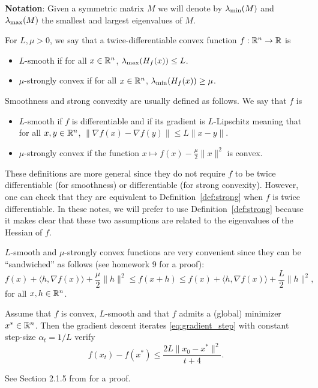 \documentclass[11pt,nocut]{article}
\begin{document}
\textbf{Notation}: Given a symmetric matrix $M$ we will denote by $\lambda_{\rm min}(M)$ and $\lambda_{\rm max}(M)$ the smallest and largest eigenvalues of $M$. 
\begin{definition}\label{def:strong}
	For $L,\mu >0$, we say that a twice-differentiable convex function $f: \mathbb{R}^n \to \mathbb{R}$ is
	\begin{itemize}
		\item $L$-smooth if for all $x \in \mathbb{R}^n$, $\lambda_{\rm max}(H_f(x)) \leq L$.
		\item $\mu$-strongly convex if for all $x \in \mathbb{R}^n$, $\lambda_{\rm min}(H_f(x)) \geq \mu$.
	\end{itemize}
\end{definition}
\begin{remark}
	Smoothness and strong convexity are usually defined as follows. We say that $f$ is
	\begin{itemize}
		\item $L$-smooth if $f$ is differentiable and if its gradient is $L$-Lipschitz meaning that for all $x,y \in \mathbb{R}^n$, $\| \nabla f(x) - \nabla f(y) \| \leq L \|x-y\|$.
		\item $\mu$-strongly convex if the function $x \mapsto f(x) - \frac{\mu}{2} \|x\|^2$ is convex.
	\end{itemize}
	These definitions are more general since they do not require $f$ to be twice differentiable (for smoothness) or differentiable (for strong convexity). However, one can check that they are equivalent to Definition~\ref{def:strong} when $f$ is twice differentiable. In these notes, we will prefer to use Definition~\ref{def:strong} because it makes clear that these two assumptions are related to the eigenvalues of the Hessian of $f$.
\end{remark}

\begin{remark}\label{rem:sandwich}
	$L$-smooth and $\mu$-strongly convex functions are very convenient since they can be ``sandwiched'' as follows (see homework 9 for a proof):
	$$
	f(x) + \langle h ,\nabla f(x) \rangle + \frac{\mu}{2} \|h\|^2 
	\leq f(x+h) \leq
	f(x) + \langle h ,\nabla f(x) \rangle + \frac{L}{2} \|h\|^2,
	$$
	for all $x,h \in\mathbb{R}^n$.
\end{remark}

\begin{theorem}\label{th:gradient1}
	Assume that $f$ is convex, $L$-smooth and that $f$ admits a (global) minimizer $x^* \in \mathbb{R}^n$. Then
	the gradient descent iterates \eqref{eq:gradient_step} with constant step-size $\alpha_t = 1/L$ verify
	$$
	f(x_t) - f(x^*) \leq \frac{2 L \| x_0 - x^* \|^2}{t+4}.
	$$
\end{theorem}
See Section 2.1.5 from \cite{nesterov2018lectures} for a proof.
\end{document}
